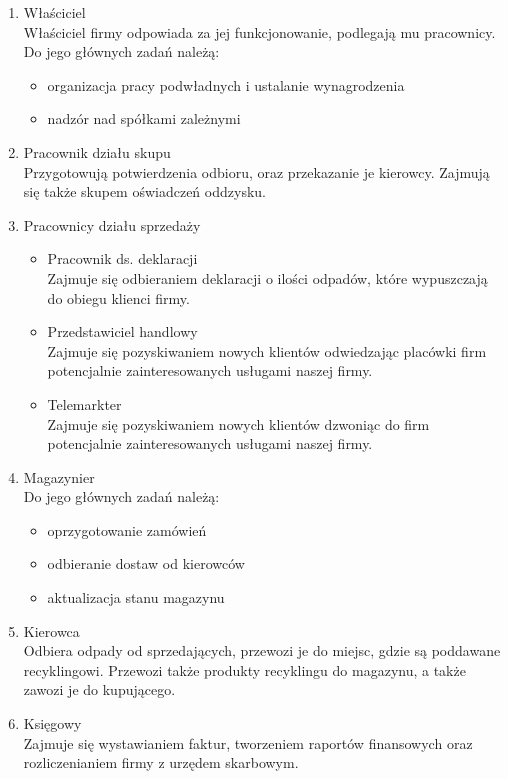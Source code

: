 
\begin{enumerate}
	\item Właściciel \\ 
	Właściciel firmy odpowiada za jej funkcjonowanie, podlegają mu pracownicy. Do jego głównych zadań należą:
	\begin{itemize}
		\item organizacja pracy podwładnych i ustalanie wynagrodzenia
		\item nadzór nad spółkami zależnymi
	\end{itemize}
	\item Pracownik działu skupu \\
	Przygotowują potwierdzenia odbioru, oraz przekazanie je kierowcy. Zajmują się także skupem oświadczeń oddzysku.
	\item Pracownicy działu sprzedaży
	\begin{itemize}
	\item Pracownik ds. deklaracji \\
	Zajmuje się odbieraniem deklaracji o ilości odpadów, które wypuszczają do obiegu klienci firmy.
	\item Przedstawiciel handlowy\\
	Zajmuje się pozyskiwaniem nowych klientów odwiedzając placówki firm potencjalnie zainteresowanych usługami naszej firmy.
	\item Telemarkter \\
	Zajmuje się pozyskiwaniem nowych klientów dzwoniąc do firm potencjalnie zainteresowanych usługami naszej firmy.
	\end{itemize}
	\item Magazynier \\
	Do jego głównych zadań należą:
		\begin{itemize}
		\item oprzygotowanie zamówień
		\item odbieranie dostaw od kierowców
		\item aktualizacja stanu magazynu
		\end{itemize}
	\item Kierowca \\
	Odbiera odpady od sprzedających, przewozi je do miejsc, gdzie są poddawane recyklingowi. Przewozi także produkty recyklingu do magazynu, a także zawozi je do kupującego.
	\item Księgowy \\
	Zajmuje się wystawianiem faktur, tworzeniem raportów finansowych oraz rozliczenianiem firmy z urzędem skarbowym.
\end{enumerate}

